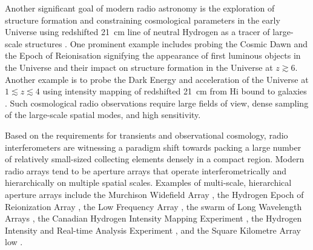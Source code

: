 \documentclass[
  journal=pasa,
  manuscript=article-type,
  year=2020,
  volume=37,
]{cup-journal}
\begin{document}
Another significant goal of modern radio astronomy is the exploration of structure formation and constraining cosmological parameters in the early Universe using redshifted 21~cm line of neutral Hydrogen as a tracer of large-scale structures \citep[][and references therein]{Morales+2010,Pritchard+2012}. One prominent example includes probing the Cosmic Dawn and the Epoch of Reionisation signifying the appearance of first luminous objects in the Universe and their impact on structure formation in the Universe at $z\gtrsim 6$. Another example is to probe the Dark Energy and acceleration of the Universe at $1\lesssim z\lesssim 4$ using intensity mapping of redshifted 21~cm from H{\sc i} bound to galaxies \citep{CosmicVisions+2018}. Such cosmological radio observations require large fields of view, dense sampling of the large-scale spatial modes, and high sensitivity. 

Based on the requirements for transients and observational cosmology, radio interferometers are witnessing a paradigm shift towards packing a large number of relatively small-sized collecting elements densely in a compact region. 
Modern radio arrays tend to be aperture arrays that operate interferometrically and hierarchically on multiple spatial scales. Examples of multi-scale, hierarchical aperture arrays include the Murchison Widefield Array \cite[MWA;][]{Tingay+2013}, the Hydrogen Epoch of Reionization Array \citep[HERA;][]{HERA+2017}, the Low Frequency Array \cite[LOFAR;][]{vanHaarlem+2013}, the swarm of Long Wavelength Arrays \cite[LWA Swarm;][]{Dowell+2018}, the Canadian Hydrogen Intensity Mapping Experiment \citep[CHIME;][]{CHIME+2022}, the Hydrogen Intensity and Real-time Analysis Experiment \citep[HIRAX;][]{HIRAX+2022}, and the Square Kilometre Array low \cite[SKA-low;][]{Dewdney+2009,SKA1+2019}. 
\end{document}
